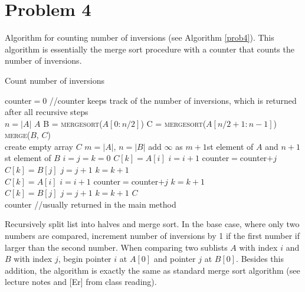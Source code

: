 \documentclass{article}
\begin{document}
\section*{Problem 4}
Algorithm for counting number of inversions (see Algorithm \ref{prob4}). This algorithm is essentially the merge sort procedure with a counter that counts the number of inversions.

	\begin{algorithm}
	\caption{Count number of inversions}\label{prob4}
	\begin{algorithmic}[1]
		\State counter$=0$ //counter keeps track of the number of inversions, which is returned after all recursive steps
		\\
			\State $n=|A|$
				\State \Return $A$
			\EndIf
			\State B = \textsc{mergesort}($A[0:n/2]$)
			\State C = \textsc{mergesort}($A[n/2+1:n-1]$)
			\State \Return \textsc{merge}($B$, $C$)
		\EndFunction
		\\
		\State create empty array $C$
		\State $m = |A|$, $n = |B|$
		\State add $\infty$ as $m+1$st element of $A$ and $n+1$st element of $B$
		\State $i=j=k=0$
				\State $C[k]=A[i]$
				\State $i=i+1$
				\State counter$=$counter$+j$
				\State $C[k]=B[j]$
				\State $j=j+1$
			\EndIf
			\State $k=k+1$
		\EndWhile
		\\
		\While{$A[i]\neq \infty$}
			\State $C[k]=A[i]$
			\State $i=i+1$
			\State counter$=$counter$+j$
			\State $k=k+1$
		\EndWhile
		\\
		\While{$B[j]\neq \infty$}
			\State $C[k]=B[j]$
			\State $j=j+1$
			\State $k=k+1$
		\EndWhile
		\State \Return $C$
		\EndFunction
		\\
		\State \Return counter //usually returned in the main method
	\end{algorithmic}
	\end{algorithm}

Recursively split list into halves and merge sort. In the base case, where only two numbers are compared, increment number of inversions by 1 if the first number if larger than the second number. When comparing two sublists $A$ with index $i$ and $B$ with index $j$, begin pointer $i$ at $A[0]$ and pointer $j$ at $B[0]$. Besides this addition, the algorithm is exactly the same as standard merge sort algorithm (see lecture notes and [Er] from class reading).
\end{document}
